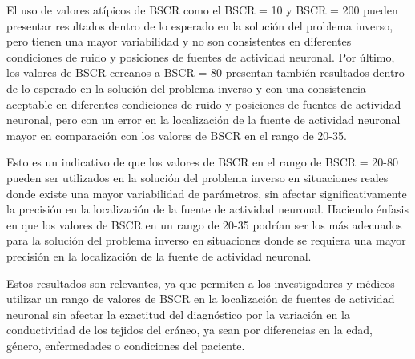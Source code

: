 El uso de valores atípicos de BSCR como el BSCR = 10 y BSCR = 200 pueden presentar resultados dentro de lo esperado en la solución del problema inverso, pero tienen una mayor variabilidad y no son consistentes en diferentes condiciones de ruido y posiciones de fuentes de actividad neuronal.
Por último, los valores de BSCR cercanos a BSCR = 80 presentan también resultados dentro de lo esperado en la solución del problema inverso y con una consistencia aceptable en diferentes condiciones de ruido y posiciones de fuentes de actividad neuronal, pero con un error en la localización de la fuente de actividad neuronal mayor en comparación con los valores de BSCR en el rango de 20-35.

Esto es un indicativo de que los valores de BSCR en el rango de BSCR = 20-80 pueden ser utilizados en la solución del problema inverso en situaciones reales donde existe una mayor variabilidad de parámetros, sin afectar significativamente la precisión en la localización de la fuente de actividad neuronal. 
Haciendo énfasis en que los valores de BSCR en un rango de 20-35 podrían ser los más adecuados para la solución del problema inverso en situaciones donde se requiera una mayor precisión en la localización de la fuente de actividad neuronal.

Estos resultados son relevantes, ya que permiten a los investigadores y médicos utilizar un rango de valores de BSCR en la localización de fuentes de actividad neuronal sin afectar la exactitud del diagnóstico por la variación en la conductividad de los tejidos del cráneo, ya sean por diferencias en la edad, género, enfermedades o condiciones del paciente.